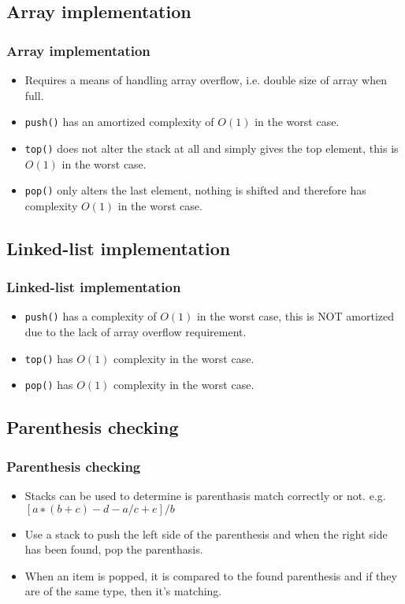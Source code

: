 \documentclass{beamer}
\begin{document}
\subsection{Array implementation}
\begin{frame}
\frametitle{Array implementation}
\begin{itemize}
\item Requires a means of handling {\color{red} array overflow}, i.e. double size of array when full.
\item \texttt{push()} has an {\color{green} amortized} complexity of $O(1)$ in the worst case.
\item \texttt{top()} does not alter the stack at all and simply gives the top element, this is $O(1)$ in the worst case.
\item \texttt{pop()} only alters the last element, nothing is shifted and therefore has complexity $O(1)$ in the worst case.
\end{itemize}
\end{frame}
\subsection{Linked-list implementation}
\begin{frame}
\frametitle{Linked-list implementation}
\begin{itemize}
\item \texttt{push()} has a complexity of $O(1)$ in the worst case, this is {\color{red} NOT} {\color{green} amortized} due to the lack of array overflow requirement.
\item \texttt{top()} has $O(1)$ complexity in the worst case.
\item \texttt{pop()} has $O(1)$ complexity in the worst case.
\end{itemize}
\end{frame}
\subsection{Parenthesis checking}
\begin{frame}
\frametitle{Parenthesis checking}
\begin{itemize}
\item Stacks can be used to determine is parenthasis match correctly or not.
e.g. $[
a
∗
(
b
+
c
)
−{
d
−
a
}
/c
+
e
]
/b$
\item Use a stack to push the left side of the parenthesis and when the right side has been found, pop the parenthasis.
\item When an item is popped, it is compared to the found parenthesis and if they are of the same type, then it's matching.

\end{itemize}
\end{frame}
\end{document}
